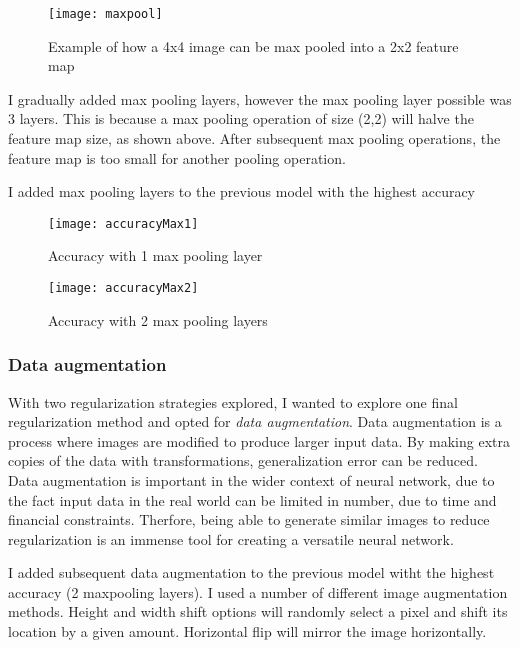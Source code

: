 \documentclass{article}
\begin{document}
\begin{figure}[H]
    \begin{center}
        \texttt{[image: maxpool]}
        \caption{Example of how a 4x4 image can be max pooled into a 2x2 feature map\autocite{maxpool}}
    \end{center}
\end{figure}

I gradually added max pooling layers, however the max pooling layer possible was 3 layers. This is because a max pooling operation of size (2,2) will halve the feature map size, as shown above. After subsequent max pooling operations, the feature map is too small for another pooling operation.

I added max pooling layers to the previous model with the highest accuracy

\begin{figure}[H]
    \begin{center}
        \texttt{[image: accuracyMax1]}
        \caption{Accuracy with 1 max pooling layer}
    \end{center}
\end{figure}

\begin{figure}[H]
    \begin{center}
        \texttt{[image: accuracyMax2]}
        \caption{Accuracy with 2 max pooling layers}
    \end{center}
\end{figure}

\subsubsection{Data augmentation}
With two regularization strategies explored, I wanted to explore one final regularization method and opted for \emph{data augmentation}. Data augmentation is a process where images are modified to produce larger input data. By making extra copies of the data with transformations, generalization error can be reduced. \cite[240]{deep16} Data augmentation is important in the wider context of neural network, due to the fact input data in the real world can be limited in number, due to time and financial constraints. Therfore, being able to generate similar images to reduce regularization is an immense tool for creating a versatile neural network. 

I added subsequent data augmentation to the previous model witht the highest accuracy (2 maxpooling layers). I used a number of different image augmentation methods. Height and width shift options will randomly select a pixel and shift its location by a given amount. Horizontal flip will mirror the image horizontally. 
\end{document}

